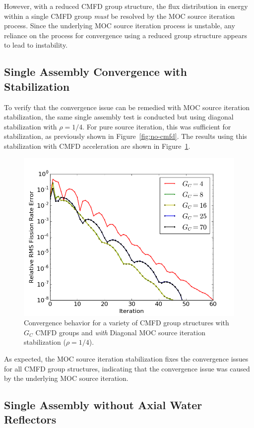 However, with a reduced \ac{CMFD} group structure, the flux distribution in energy within a single \ac{CMFD} group \textit{must} be resolved by the \ac{MOC} source iteration process. Since the underlying \ac{MOC} source iteration process is unstable, any reliance on the process for convergence using a reduced group structure appears to lead to instability.

\subsection{Single Assembly Convergence with Stabilization}

To verify that the convergence issue can be remedied with \ac{MOC} source iteration stabilization, the same single assembly test is conducted but using diagonal stabilization with $\rho = 1/4$. For pure source iteration, this was sufficient for stabilization, as previously shown in Figure~\ref{fig:no-cmfd}. The results using this stabilization with \ac{CMFD} acceleration are shown in Figure~\ref{fig:sa-cmfd-stab}. 
\begin{figure}[ht!]
	\centering
	\includegraphics[width=0.65\linewidth]{figures/convergence/sa_stab_cmfd.png}
	\caption{Convergence behavior for a variety of \ac{CMFD} group structures with $G_C$ \ac{CMFD} groups and \textit{with} Diagonal \ac{MOC} source iteration stabilization ($\rho = 1/4$).}
	\label{fig:sa-cmfd-stab}
\end{figure}
As expected, the \ac{MOC} source iteration stabilization fixes the convergence issues for all \ac{CMFD} group structures, indicating that the convergence issue was caused by the underlying \ac{MOC} source iteration.

\subsection{Single Assembly without Axial Water Reflectors}
\label{sec:sa-no-axial-ref}

